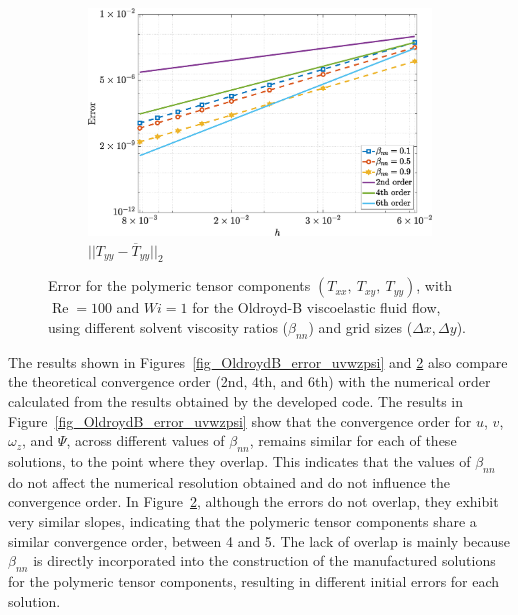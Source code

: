 \documentclass[preprint, 12pt]{elsarticle}
\begin{document}
\begin{figure}[H]
\begin{subfigure}[b]{.46\textwidth}
        \includegraphics[width=\textwidth]{NormErr_2nd_Re_100_Wi_1_epsilon_0_xi_0_alphaG_0_Dt_1e-06_at_0.05_tipsim_1_MMS_12_Tyy.eps}
        \caption{$||T_{yy} - \overline{T}_{yy}||_{2}$}
        \label{error_tyy_2nd_Case1_oldorydb}
    \end{subfigure}
    \vspace{0.02cm}
    \caption{Error for the polymeric tensor components $({T}_{xx},~{T}_{xy},~{T}_{yy})$, with $\operatorname{Re}=100$ and $Wi=1$ for the Oldroyd-B viscoelastic fluid flow, using different solvent viscosity ratios ($\beta_{nn}$) and grid sizes ($\Delta x, \Delta y$).\label{fig_OldroydB_error_txxxyyy}}
\end{figure}

The results shown in Figures~\ref{fig_OldroydB_error_uvwzpsi} and \ref{fig_OldroydB_error_txxxyyy}  also compare the theoretical convergence order (2nd, 4th, and 6th) with the numerical order calculated from the results obtained by the developed code. The results in Figure~\ref{fig_OldroydB_error_uvwzpsi} show that the convergence order for $u$, $v$, $\omega_{z}$, and $\Psi$, across different values of $\beta_{nn}$, remains similar for each of these solutions, to the point where they overlap. This indicates that the values of $\beta_{nn}$ do not affect the numerical resolution obtained and do not influence the convergence order. In Figure~\ref{fig_OldroydB_error_txxxyyy}, although the errors do not overlap, they exhibit very similar slopes, indicating that the polymeric tensor components share a similar convergence order, between 4 and 5. The lack of overlap is mainly because $\beta_{nn}$ is directly incorporated into the construction of the manufactured solutions for the polymeric tensor components, resulting in different initial errors for each solution.
\end{document}
